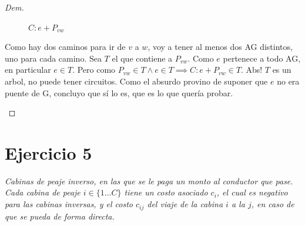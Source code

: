 \documentclass[12pt, a4paper]{report}
\theoremstyle{definition} %
\begin{document}
\begin{proof}[Dem]
\begin{enumerate}
\begin{figure}[H]
            \caption*{$C: e + P_{vw}$}
        \end{figure}

        Como hay dos caminos para ir de $v$ a $w$, voy a tener al menos dos AG distintos, uno para cada camino. Sea $T$ el que contiene a $P_{vw}$. Como $e$ pertenece a todo AG, en particular $e \in T$. Pero como $P_{vw} \in T \wedge e \in T \implies C: e + P_{vw} \in T$. Abs! $T$ es un arbol, no puede tener circuitos. Como el absurdo provino de suponer que $e$ no era puente de G, concluyo que sí lo es, que es lo que quería probar.

    \end{enumerate}

\end{proof}

\newpage
\section*{Ejercicio 5}

\textit{Cabinas de peaje inverso, en las que se le paga un monto al conductor que pase. Cada cabina de peaje $i \in \{1 \dotso C \}$ tiene un costo asociado $c_i$, el cual es negativo para las cabinas inversas, y el costo $c_{ij}$ del viaje de la cabina $i$ a la $j$, en caso de que se pueda de forma directa.}
\end{document}
